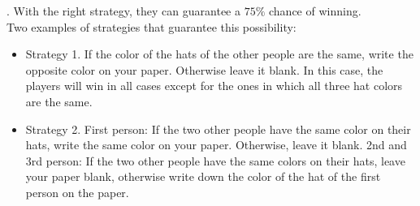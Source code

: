 \begin{solution}.
With the right strategy, they can guarantee a $75\%$ chance of winning.\\[0.2cm]

Two examples of strategies that guarantee this possibility:

\begin{itemize}
	\item Strategy 1. If the color of the hats of the other people are the same, write the opposite color on your paper. Otherwise leave it blank. In this case, the players will win in all cases except for the ones in which all three hat colors are the same.

\item Strategy 2. First person: If the two other people have the same color on their hats, write the same color on your paper. Otherwise, leave it blank.
2nd and 3rd person: If the two other people have the same colors on their hats, leave your paper blank, otherwise write down the color of the hat of the first person on the paper.
\end{itemize}

\end{solution}